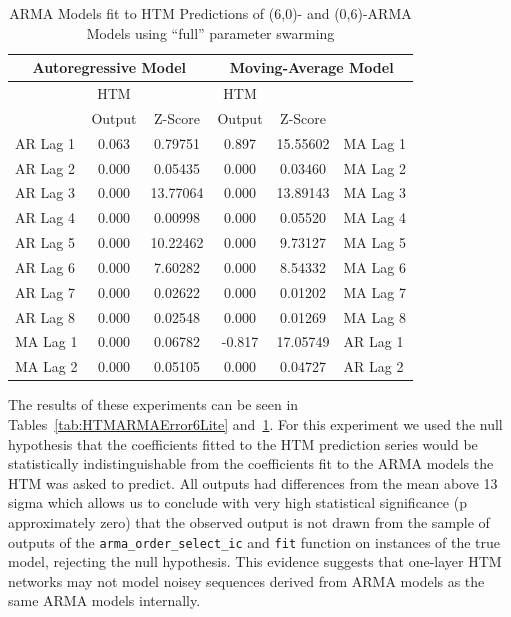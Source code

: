 \documentclass[oneside,12pt,openany]{book}
\begin{document}
	\begin{table}[hbt!]
		\centering
		\begin{tabular}{|l|c|c|c|c|l|}
			\hline
			\multicolumn{3}{|c|}{Autoregressive Model} & \multicolumn{3}{c|}{Moving-Average Model} \\ \hline
			\cellcolor{black} & HTM & & HTM &  & \cellcolor{black} \\
			\cellcolor{black} & Output & Z-Score & Output & Z-Score & \cellcolor{black} \\ \hline
			AR Lag 1 & 0.063 & 0.79751 & 0.897 & 15.55602 & MA Lag 1 \\ \hline
			AR Lag 2 & 0.000 & 0.05435 & 0.000 & 0.03460 & MA Lag 2 \\ \hline
			AR Lag 3 & 0.000 & 13.77064 & 0.000 & 13.89143 & MA Lag 3 \\ \hline
			AR Lag 4 & 0.000 & 0.00998 & 0.000 & 0.05520 & MA Lag 4 \\ \hline
			AR Lag 5 & 0.000 & 10.22462 & 0.000 & 9.73127 & MA Lag 5 \\ \hline
			AR Lag 6 & 0.000 & 7.60282 & 0.000 & 8.54332 & MA Lag 6 \\ \hline
			AR Lag 7 & 0.000 & 0.02622 & 0.000 & 0.01202 & MA Lag 7 \\ \hline
			AR Lag 8 & 0.000 & 0.02548 & 0.000 & 0.01269 & MA Lag 8 \\ \hline
			MA Lag 1 & 0.000 & 0.06782 & -0.817 & 17.05749 & AR Lag 1 \\ \hline
			MA Lag 2 & 0.000 & 0.05105 & 0.000 & 0.04727 & AR Lag 2 \\ \hline
		\end{tabular}
		\caption{ARMA Models fit to HTM Predictions of (6,0)- and (0,6)-ARMA Models using ``full'' parameter swarming}
		\label{tab:HTMARMAError6Full}
	\end{table}
	
	The results of these experiments can be seen in Tables~\ref{tab:HTMARMAError6Lite} and~\ref{tab:HTMARMAError6Full}. For this experiment we used the null hypothesis that the coefficients fitted to the HTM prediction series would be statistically indistinguishable from the coefficients fit to the ARMA models the HTM was asked to predict. All outputs had differences from the mean above 13 sigma which allows us to conclude with very high statistical significance (p approximately zero) that the observed output is not drawn from the sample of outputs of the \texttt{arma\_order\_select\_ic} and \texttt{fit} function on instances of the true model, rejecting the null hypothesis. This evidence suggests that one-layer HTM networks may not model noisey sequences derived from ARMA models as the same ARMA models internally.
	
\end{document}
